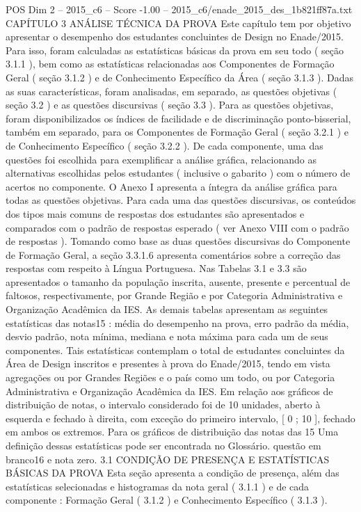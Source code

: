 \begin{textsample}{POS Dim 2 – 2015\_c6 – Score -1.00 – 2015\_c6/enade\_2015\_des\_1b821ff87a.txt}  \label{ex:f2_pos_239}
CAPÍTULO 3 ANÁLISE TÉCNICA DA PROVA Este capítulo tem por objetivo apresentar o desempenho dos estudantes concluintes de Design no Enade/2015.
Para isso, foram calculadas as estatísticas básicas da prova em seu todo ( seção 3.1.1 ), bem como as estatísticas relacionadas aos Componentes de Formação Geral ( seção 3.1.2 ) e de Conhecimento Específico da Área ( seção 3.1.3 ).
Dadas as suas características, foram analisadas, em separado, as questões objetivas ( seção 3.2 ) e as questões discursivas ( seção 3.3 ).
Para as questões objetivas, foram disponibilizados os índices de facilidade e de discriminação ponto-bisserial, também em separado, para os Componentes de Formação Geral ( seção 3.2.1 ) e de Conhecimento Específico ( seção 3.2.2 ).
De cada componente, uma das questões foi escolhida para exemplificar a análise gráfica, relacionando as alternativas escolhidas pelos estudantes ( inclusive o gabarito ) com o número de acertos no componente.
O Anexo I apresenta a íntegra da análise gráfica para todas as questões objetivas.
Para cada uma das questões discursivas, os conteúdos dos tipos mais comuns de respostas dos estudantes são apresentados e comparados com o padrão de respostas esperado ( ver Anexo VIII com o padrão de respostas ).
Tomando como base as duas questões discursivas do Componente de Formação Geral, a seção 3.3.1.6 apresenta comentários sobre a correção das respostas com respeito à Língua Portuguesa.
Nas Tabelas 3.1 e 3.3 são apresentados o tamanho da população inscrita, ausente, presente e percentual de faltosos, respectivamente, por Grande Região e por Categoria Administrativa e Organização Acadêmica da IES.
As demais tabelas apresentam as seguintes estatísticas das notas15 : média do desempenho na prova, erro padrão da média, desvio padrão, nota mínima, mediana e nota máxima para cada um de seus componentes.
Tais estatísticas contemplam o total de estudantes concluintes da Área de Design inscritos e presentes à prova do Enade/2015, tendo em vista agregações ou por Grandes Regiões e o país como um todo, ou por Categoria Administrativa e Organização Acadêmica da IES.
Em relação aos gráficos de distribuição de notas, o intervalo considerado foi de 10 unidades, aberto à esquerda e fechado à direita, com exceção do primeiro intervalo, [ 0 ; 10 ], fechado em ambos os extremos.
Para os gráficos de distribuição das notas das 15 Uma definição dessas estatísticas pode ser encontrada no Glossário. questão em branco16 e nota zero. 3.1 CONDIÇÃO DE PRESENÇA E ESTATÍSTICAS BÁSICAS DA PROVA Esta seção apresenta a condição de presença, além das estatísticas selecionadas e histogramas da nota geral ( 3.1.1 ) e de cada componente : Formação Geral ( 3.1.2 ) e Conhecimento Específico ( 3.1.3 ).

\end{textsample}
